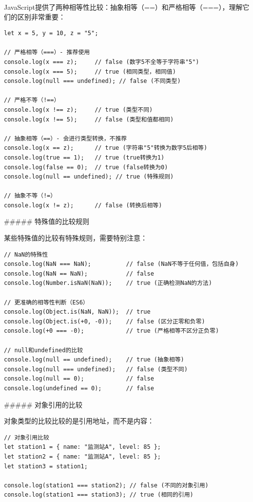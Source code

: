 {JavaScript提供了两种相等性比较：抽象相等（==）和严格相等（===），理解它们的区别非常重要：

\begin{lstlisting}[style=javascript]
let x = 5, y = 10, z = "5";

// 严格相等（===）- 推荐使用
console.log(x === z);     // false (数字5不全等于字符串"5")
console.log(x === 5);     // true (相同类型，相同值)
console.log(null === undefined); // false (不同类型)

// 严格不等（!==）
console.log(x !== z);     // true (类型不同)
console.log(x !== 5);     // false (类型和值都相同)

// 抽象相等（==）- 会进行类型转换，不推荐
console.log(x == z);      // true (字符串"5"转换为数字5后相等)
console.log(true == 1);   // true (true转换为1)
console.log(false == 0);  // true (false转换为0)
console.log(null == undefined); // true (特殊规则)

// 抽象不等（!=）
console.log(x != z);      // false (转换后相等)
\end{lstlisting}

##### 特殊值的比较规则

某些特殊值的比较有特殊规则，需要特别注意：

\begin{lstlisting}[style=javascript]
// NaN的特殊性
console.log(NaN === NaN);          // false (NaN不等于任何值，包括自身)
console.log(NaN == NaN);           // false
console.log(Number.isNaN(NaN));    // true (正确检测NaN的方法)

// 更准确的相等性判断（ES6）
console.log(Object.is(NaN, NaN));  // true
console.log(Object.is(+0, -0));    // false (区分正零和负零)
console.log(+0 === -0);            // true (严格相等不区分正负零)

// null和undefined的比较
console.log(null == undefined);    // true (抽象相等)
console.log(null === undefined);   // false (类型不同)
console.log(null == 0);            // false
console.log(undefined == 0);       // false
\end{lstlisting}

##### 对象引用的比较

对象类型的比较比较的是引用地址，而不是内容：

\begin{lstlisting}[style=javascript]
// 对象引用比较
let station1 = { name: "监测站A", level: 85 };
let station2 = { name: "监测站A", level: 85 };
let station3 = station1;

console.log(station1 === station2); // false (不同的对象引用)
console.log(station1 === station3); // true (相同的引用)


\end{lstlisting}}
